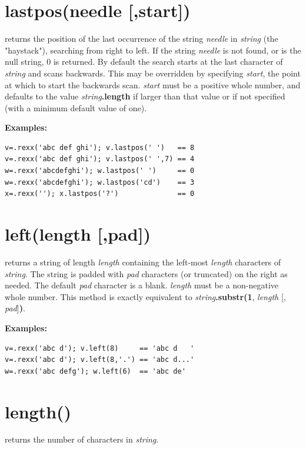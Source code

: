 \section{lastpos(needle [,start{]})}\label{reflastpos}
returns the position of the last occurrence of the string
\emph{needle} in \emph{string} (the "haystack"), searching
from right to left.
If the string \emph{needle} is not found, or is the null string,
0 is returned.
By default the search starts at the last character of
\emph{string} and scans backwards.
This may be overridden by specifying \emph{start}, the point at
which to start the backwards scan.
\emph{start} must be a positive whole number, and defaults to the
value \emph{string}\textbf{.length} if larger than that
value or if not specified (with a minimum default value of one).
 
\textbf{Examples:}
\begin{lstlisting}
v=.rexx('abc def ghi'); v.lastpos(' ')   == 8
v=.rexx('abc def ghi'); v.lastpos(' ',7) == 4
w=.rexx('abcdefghi'); w.lastpos(' ')     == 0
w=.rexx('abcdefghi'); w.lastpos('cd')    == 3
x=.rexx(''); x.lastpos('?')              == 0
\end{lstlisting}

\section{left(length [,pad{]})}\label{refleft}
returns a string of length \emph{length} containing the
left-most \emph{length} characters of \emph{string}.
The string is padded with \emph{pad} characters (or truncated) on
the right as needed.
The default \emph{pad} character is a blank.
\emph{length} must be a non-negative whole number.
This method is exactly equivalent to
\emph{string}\textbf{.substr(1}, \emph{length}
[, \emph{pad}]\textbf{)}.
 
\textbf{Examples:}
\begin{lstlisting}
v=.rexx('abc d'); v.left(8)     == 'abc d   '
v=.rexx('abc d'); v.left(8,'.') == 'abc d...'
w=.rexx('abc defg'); w.left(6)  == 'abc de'
\end{lstlisting}

\section{length()}\label{reflength}
returns the number of characters in \emph{string}.

